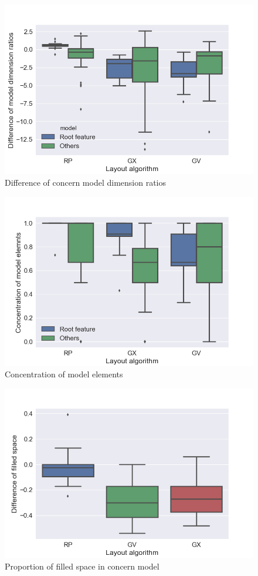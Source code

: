 \begin{figure}
\includegraphics[width=0.9\linewidth]{Evaluation/modelratio_Concern.png}
	\caption{Difference of concern model dimension ratios}
	\label{concern model ratio}
\end{figure}

\begin{figure}
\includegraphics[width=0.9\linewidth]{Evaluation/linked_Concern.png}
	\caption{Concentration of model elements}
	\label{concern linked components}
\end{figure}


\begin{figure}
\includegraphics[width=\linewidth]{Evaluation/filledspace.png}
	\caption{Proportion of filled space in concern model}
	\label{concern filled space}
\end{figure}

